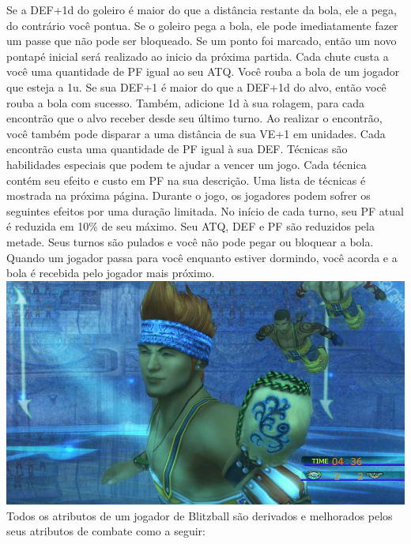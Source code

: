 Se a DEF+1d do goleiro é maior do que a distância restante da bola, ele a pega, do contrário você pontua.
Se o goleiro pega a bola, ele pode imediatamente fazer um passe que não pode ser bloqueado. Se um ponto foi marcado, então um novo pontapé inicial será realizado ao inicio da próxima partida.
Cada chute custa a você uma quantidade de PF igual ao seu ATQ.
%	
\ofrow
%
 Você rouba a bola de um jogador que esteja a 1u.
Se sua DEF+1 é maior do que a DEF+1d do alvo, então você rouba a bola com sucesso. Também, adicione 1d à sua rolagem, para cada encontrão que o alvo receber desde seu último turno.
Ao realizar o encontrão, você também pode disparar a uma distância de sua VE+1 em unidades.
Cada encontrão custa uma quantidade de PF igual à sua DEF.
%
\ofrow
%	
Técnicas são habilidades especiais que podem te ajudar a vencer um jogo.
Cada técnica contém seu efeito e custo em PF na sua descrição.
Uma lista de técnicas é mostrada na próxima página.
%
\vfill
%
Durante o jogo, os jogadores podem sofrer os seguintes efeitos por uma duração limitada.\ofrow
{} No início de cada turno, seu PF atual é reduzida em 10\% de seu máximo.\ofrow
{} Seu ATQ, DEF e PF são reduzidos pela metade.\ofrow
{} Seus turnos são pulados e você não pode pegar ou bloquear a bola.
Quando um jogador passa para você enquanto estiver dormindo, você acorda e a bola é recebida pelo jogador mais próximo.
%
\clearpage
%
\ofpar
%
\includegraphics[width=\columnwidth]{./art/blitz/ingame.jpg}
%
\ofpar
%
Todos os atributos de um jogador de Blitzball são derivados e melhorados pelos seus atributos de combate como a seguir:\ofrow
{} \ofrow
{} \ofrow
{} \ofrow
